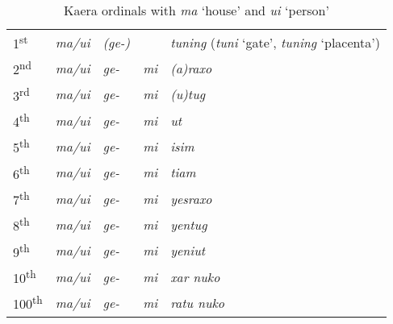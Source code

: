\begin{table}\centering
\caption{Kaera ordinals with \textit{ma} `house' and \textit{ui} `person'}



\begin{tabular}{lllll}
1\textsuperscript{st} & \textit{ma/ui} & \textit{(ge-)} &  & \textit{tuning } (\textit{tuni} `gate', \textit{tuning} `placenta')\\
2\textsuperscript{nd} & \textit{ma/ui} & \textit{ge-} & \textit{mi} & \textit{(a)raxo}\\
3\textsuperscript{rd} & \textit{ma/ui} & \textit{ge-} & \textit{mi} & \textit{(u)tug}\\
4\textsuperscript{th} & \textit{ma/ui} & \textit{ge-} & \textit{mi} & \textit{ut}\\
5\textsuperscript{th} & \textit{ma/ui} & \textit{ge-} & \textit{mi} & \textit{isim}\\
6\textsuperscript{th} & \textit{ma/ui} & \textit{ge-} & \textit{mi} & \textit{tiam}\\
7\textsuperscript{th} & \textit{ma/ui} & \textit{ge-} & \textit{mi} & \textit{yesraxo} \\
8\textsuperscript{th} & \textit{ma/ui} & \textit{ge- } & \textit{mi} & \textit{yentug}\\
9\textsuperscript{th} & \textit{ma/ui} & \textit{ge-} & \textit{mi} & \textit{yeniut}\\
10\textsuperscript{th} & \textit{ma/ui} & \textit{ge-} & \textit{mi} & \textit{xar nuko}\\
100\textsuperscript{th} & \textit{ma/ui} & \textit{ge-} & \textit{mi} & \textit{ratu nuko}\\
\end{tabular}

\end{table}

